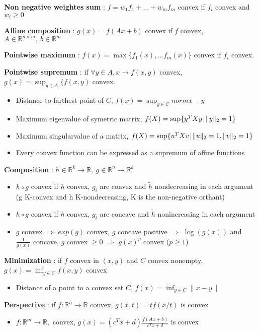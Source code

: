 \documentclass[a4paper, 10pt]{article}
\newcommand{\norm}[1]{\|#1\|}
\newcommand{\set}[2]{\{ #1 \hspace{.1em} | \hspace{.1em}#2 \}}
\newcommand{\R}{\mathbb{R}}
\newcommand{\Rn}{\mathbb{R}^n}
\newcommand{\itm}[1]{{\color{itmcolor} \textbf{#1}}}
\begin{document}
\itm{Non negative weightes sum} : $f = w_1 f_1 + \dots + w_m f_m$ convex if $f_i$ convex and $w_i \ge 0$

\itm{Affine composition} : $g(x) = f(Ax + b)$ convex if $f$ convex, $A \in \R^{n \times m},\ b \in \R^m$

\itm{Pointwise maximum} : $f(x) = \max\{f_1(x), \dots f_m(x)\}$ convex if $f_i$ convex.

\itm{Pointwise supremum} : if $\forall y \in A, x \to f(x, y)$ convex, $g(x) = \sup_{y \in A} \{f(x, y)$ convex.
\begin{itemize}
\item Distance to farthest point of $C$, $f(x) = \sup_{y \in C}{norm{x - y}}$
\item Maximum eigenvalue of symetric matrix, $f(X) = \sup \set{y^T X y}{\norm{y}_2 = 1}$
\item Maximum singularvalue of a matrix, $f(X) = \sup \set{u^T X v}{\norm{u}_2 = 1, \norm{v}_2 = 1}$
\item Every convex function can be expressed as a supremum of affine functions
\end{itemize}

\itm{Composition} : $h \in \R^k \to \R,\ g \in \R^n \to \R^k$
\begin{itemize}
\item $h \circ g$ convex if $h$ convex, $g_i$ are convex and $\tilde{h}$ nondecreasing in each argument\\
  (g K-convex and h K-nondecreasing, K is the non-negative orthant)
\item $h \circ g$ convex if $h$ convex, $g_i$ are concave and $\tilde{h}$ nonincreasing in each argument
\item $g$ convex $\Rightarrow$ $exp(g)$ convex, $g$ concave positive $\Rightarrow$ $\log(g(x))$ and $\frac{1}{g(x)}$ concave, $g$ convex $\ge 0$ $\Rightarrow$ $g(x)^p$ convex ($p \ge 1$)
\end{itemize}

\itm{Minimization} : if $f$ convex in $(x, y)$ and $C$ convex nonempty, $g(x) = \inf_{y \in C}f(x, y)$ convex
\begin{itemize}
\item Distance of a point to a convex set $C$, $f(x) = \inf_{y \in C}{\norm{x - y}}$
\end{itemize}

\itm{Perspective} : if $f : \Rn \to \R$ convex, $g(x, t) = t f(x / t)$ is convex
\begin{itemize}
\item $f : \R^m \to \R,$ convex, $g(x) = (c^T x + d) \frac{f(A x + b)}{c^T x + d}$ is convex
\end{itemize}
\end{document}
